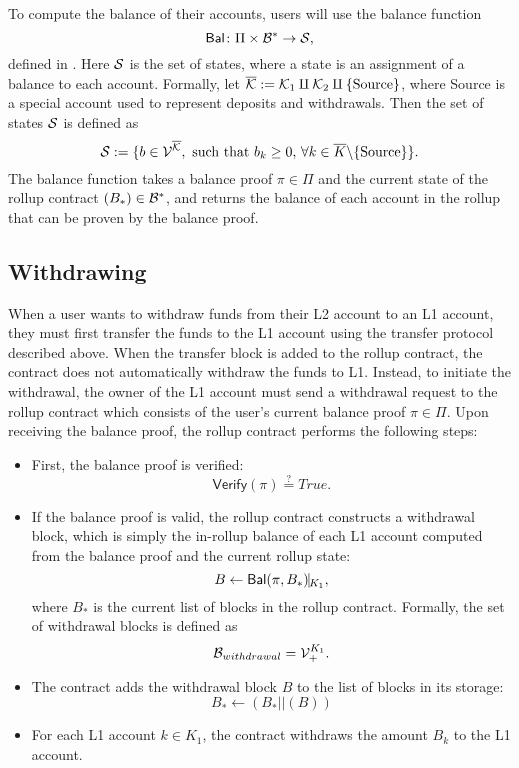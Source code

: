 To compute the balance of their accounts, users will use the balance
function \[\mathsf{Bal} \colon \Pi \times \B^* \to \S,\] defined in
. Here \(\S\) is the set of states, where a
state is an assignment of a balance to each account. Formally, let
\(\overline{\K} := \K_1 \amalg \K_2 \amalg \{\source\}\), where
Source is a special account used to represent deposits and
withdrawals. Then the set of states \(\S\) is defined
\href{https://github.com/\repo
FVIntmax/State.lean#L31}{\ExternalLink}as \[\S := \{b \in
\V^{\overline{\K}}, \text{ such that } b_k \geq 0,\, \forall k \in
\overline{K}\backslash \{\source\}\}.\] The balance function takes a
balance proof \(\pi \in \Pi\) and the current state of the rollup
contract \((B_*) \in \B^*\), and returns the balance of each account
in the rollup that can be proven by the balance proof.

\subsection{Withdrawing}\label{section:withdrawing}

When a user wants to withdraw funds from their L2 account to an L1
account, they must first transfer the funds to the L1 account using
the transfer protocol described above. When the transfer block is
added to the rollup contract, the contract does not automatically
withdraw the funds to L1. Instead, to initiate the withdrawal, the
owner of the L1 account must send a withdrawal request to the rollup
contract which consists of the user's current balance proof \(\pi \in
\Pi\). Upon receiving the balance proof, the rollup contract performs
the following steps:

\begin{itemize}
\item First, the balance proof is verified: \[\mathsf{Verify}(\pi)
\stackrel{?}{=} True.\]
\item If the balance proof is valid, the rollup contract constructs a
withdrawal block, which is simply the in-rollup balance of each L1
account computed from the balance proof and the current rollup state:
\[B \leftarrow \mathsf{Bal}(\pi,B_*)\vline_{K_1},\] where \(B_*\) is
the current list of blocks in the rollup contract. Formally, the set
of withdrawal blocks is defined \href{https://github.com/\repo
FVIntmax/Block.lean#L31}{\ExternalLink}as \[\B_{withdrawal} = \V_+^{K_1}.\]
\item The contract adds the withdrawal block \(B\) to the list of
blocks in its storage: \[B_* \leftarrow (B_* || (B))\]
\item For each L1 account \(k \in K_1\), the contract withdraws the
amount \(B_k\) to the L1 account.
\end{itemize}

